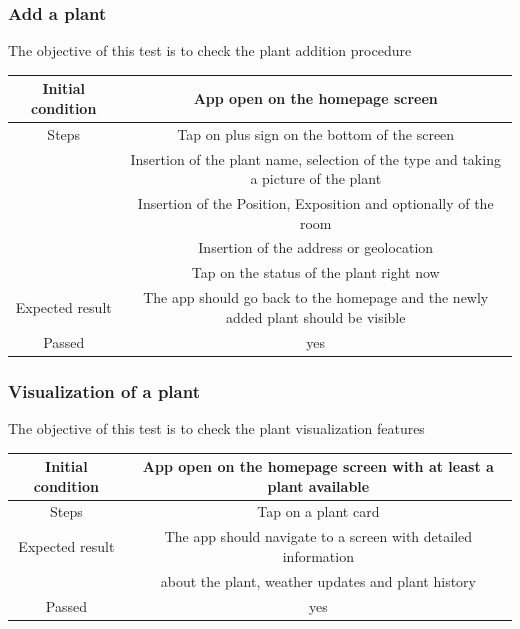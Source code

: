 \documentclass[10pt]{article}
\begin{document}
	\subsubsection{Add a plant}
	The objective of this test is to check the plant addition procedure
	\begin{center}
		\begin{tabular}{ |c|c| } 
			\hline
			Initial condition & App open on the homepage screen\\
			\hline
			Steps & Tap on plus sign on the bottom of the screen\\
			& Insertion of the plant name, selection of the type and taking a picture of the plant\\
			& Insertion of the Position, Exposition and optionally of the room\\
			& Insertion of the address or geolocation\\
			& Tap on the status of the plant right now\\
			\hline
			Expected result & The app should go back to the homepage and the newly added plant should be visible\\
			\hline
			Passed & yes\\
			\hline
		\end{tabular}
	\end{center}
	\subsubsection{Visualization of a plant}
	The objective of this test is to check the plant visualization features
	\begin{center}
		\begin{tabular}{ |c|c| } 
			\hline
			Initial condition & App open on the homepage screen with at least a plant available\\
			\hline
			Steps & Tap on a plant card\\
			\hline
			Expected result & The app should navigate to a screen with detailed information\\
			& about the plant, weather updates and plant history\\
			\hline
			Passed & yes\\
			\hline
		\end{tabular}
	\end{center}
\end{document}
